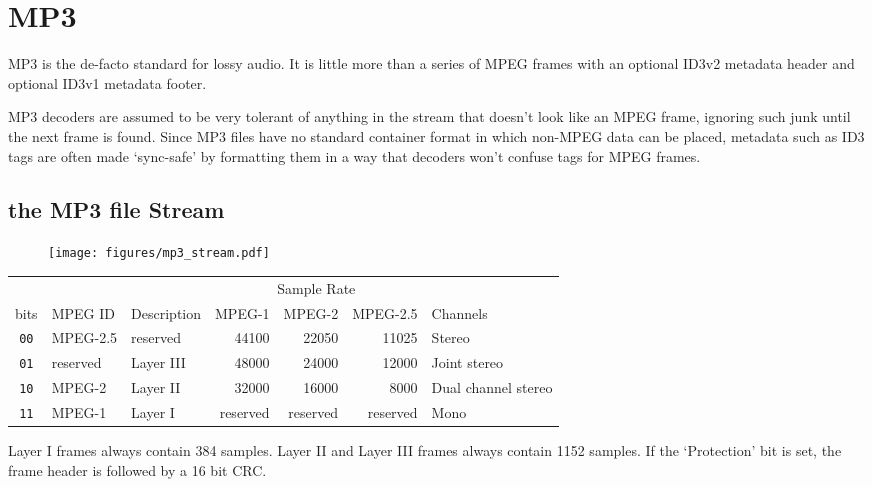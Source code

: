 \chapter{MP3}
MP3 is the de-facto standard for lossy audio.
It is little more than a series of MPEG frames with an
optional ID3v2 metadata header and optional ID3v1 metadata
footer.

MP3 decoders are assumed to be very tolerant of anything in
the stream that doesn't look like an MPEG frame, ignoring such
junk until the next frame is found.
Since MP3 files have no standard container format in which
non-MPEG data can be placed, metadata such as ID3 tags are often
made `sync-safe' by formatting them in a way that decoders won't
confuse tags for MPEG frames.
\section{the MP3 file Stream}
\begin{figure}[h]
\texttt{[image: figures/mp3\_stream.pdf]}
\end{figure}
\begin{table}[h]
\begin{tabular}{|c||l||l||r|r|r||l|}
\hline
& & & \multicolumn{3}{c||}{Sample Rate} & \\
bits & MPEG ID & Description & MPEG-1 & MPEG-2 & MPEG-2.5 & Channels \\
\hline
\texttt{00} & MPEG-2.5 & reserved & 44100 & 22050 & 11025 & Stereo \\
\texttt{01} & reserved & Layer III & 48000 & 24000 & 12000 & Joint stereo \\
\texttt{10} & MPEG-2 & Layer II & 32000 & 16000 & 8000 & Dual channel stereo\\
\texttt{11} & MPEG-1 & Layer I & reserved & reserved & reserved & Mono \\
\hline
\end{tabular}
\end{table}
\par
\noindent
Layer I frames always contain 384 samples.
Layer II and Layer III frames always contain 1152 samples.
If the `Protection' bit is set, the frame header is followed by a
16 bit CRC.

\pagebreak

